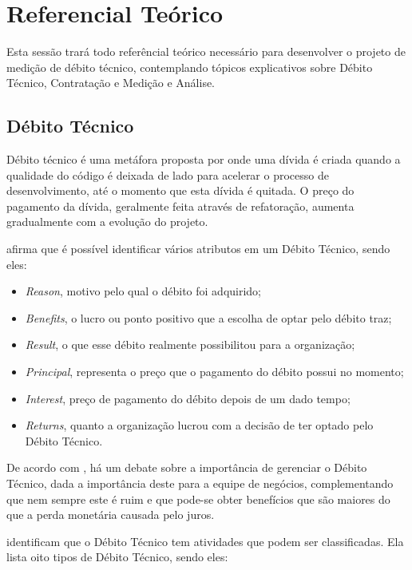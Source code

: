 \chapter[Referencial Teórico]{Referencial Teórico}

Esta sessão trará todo referêncial teórico necessário para desenvolver o projeto
de medição de débito técnico, contemplando tópicos explicativos sobre Débito Técnico,
Contratação e Medição e Análise.

\section{Débito Técnico}
Débito técnico é uma metáfora proposta por \cite{cunningham} onde uma dívida é
criada quando a qualidade do código é deixada de lado para acelerar o processo
de desenvolvimento, até o momento que esta dívida é quitada. O preço do pagamento
da dívida, geralmente feita através de refatoração, aumenta gradualmente com
a evolução do projeto.

\cite{oliveira} afirma que é possível identificar vários atributos em um Débito
Técnico, sendo eles:

\begin{itemize}
  \item \textit{Reason}, motivo pelo qual o débito foi adquirido;
  \item \textit{Benefits}, o lucro ou ponto positivo que a escolha de optar pelo débito traz;
  \item \textit{Result}, o que esse débito realmente possibilitou para a organização;
  \item \textit{Principal}, representa o preço que o pagamento do débito possui no momento;
  \item \textit{Interest}, preço de pagamento do débito depois de um dado tempo;
  \item \textit{Returns}, quanto a organização lucrou com a decisão de ter optado pelo Débito Técnico.
\end{itemize}


De acordo com \cite{mapping}, há um debate sobre a importância de gerenciar o
Débito Técnico, dada a importância deste para a equipe de negócios,
complementando que nem sempre este é ruim e que pode-se obter benefícios
que são maiores do que a perda monetária causada pelo juros.

\cite{mapping} identificam que o Débito Técnico tem atividades que podem ser classificadas.
Ela lista oito tipos de Débito Técnico, sendo eles:

